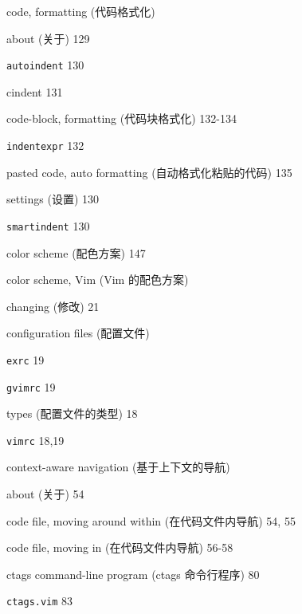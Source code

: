 \begin{multicols}{2}
\hangindent=2pc  code, formatting (代码格式化) \par
\hangindent=2pc \quad about (关于) 129 \par
\hangindent=2pc \quad \texttt{autoindent} 130 \par
\hangindent=2pc \quad cindent 131 \par
\hangindent=2pc \quad code-block, formatting (代码块格式化) 132-134 \par
\hangindent=2pc \quad \texttt{indentexpr} 132 \par
\hangindent=2pc \quad pasted code, auto formatting (自动格式化粘贴的代码) 135 \par
\hangindent=2pc \quad settings (设置) 130 \par
\hangindent=2pc \quad \texttt{smartindent} 130 \par

\hangindent=2pc  color scheme (配色方案) 147

\hangindent=2pc  color scheme, Vim (Vim 的配色方案) \par
\hangindent=2pc \quad changing (修改) 21 \par

\hangindent=2pc  configuration files (配置文件) \par
\hangindent=2pc \quad \texttt{exrc} 19 \par
\hangindent=2pc \quad \texttt{gvimrc} 19 \par
\hangindent=2pc \quad types (配置文件的类型) 18 \par
\hangindent=2pc \quad \texttt{vimrc} 18,19 \par

\hangindent=2pc  context-aware navigation (基于上下文的导航) \par
\hangindent=2pc \quad about (关于) 54 \par
\hangindent=2pc \quad code file, moving around within (在代码文件内导航) 54, 55 \par
\hangindent=2pc \quad code file, moving in (在代码文件内导航) 56-58 \par

\hangindent=2pc  ctags command-line program (ctags 命令行程序) 80

\hangindent=2pc  \texttt{ctags.vim} 83


\end{multicols}
